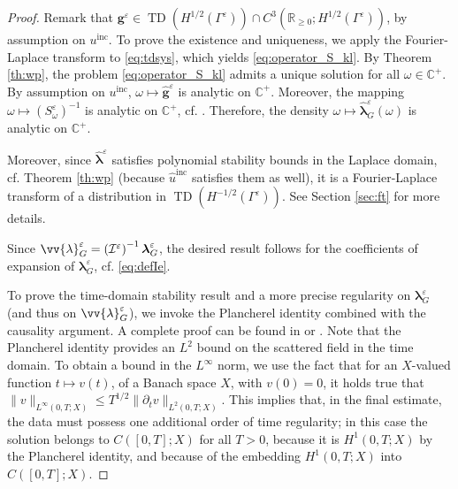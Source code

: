 \documentclass[]{article}
\numberwithin{equation}{section}
\numberwithin{theorem}{section}
\numberwithin{lemma}{section}
\numberwithin{corollary}{section}
\numberwithin{proposition}{section}
\numberwithin{definition}{section}
\newcommand{\blambda}{\boldsymbol{\lambda}}
\newcommand{\re}{\varepsilon}
\renewcommand{\vec}{\boldsymbol}
\newcommand{\adrian}[1]{{\color{magenta}{#1}}}
\newcommand{\inc}{\operatorname{inc}}
\begin{document}
	\begin{proof}
		Remark that $\vec{g}^{\re}\in \operatorname{TD}(H^{1/2}(\Gamma^{\re}))\cap C^3(\mathbb{R}_{\geq 0}; H^{1/2}(\Gamma^{\re}))$, by assumption on $u^{\operatorname{inc}}$. To prove the existence and uniqueness, we apply the Fourier-Laplace transform to \eqref{eq:tdsys}, which yields \eqref{eq:operator_S_kl}. 
		By Theorem \ref{th:wp}, the problem \eqref{eq:operator_S_kl} admits a unique solution for all $\omega \in \mathbb{C}^{+}$. By assumption on $u^{\operatorname{inc}}$, $\omega \mapsto \hat{\vec{g}}^{\re}$ is analytic on $\mathbb{C}^+$. Moreover, the mapping $\omega \mapsto (S^{\re}_{\omega})^{-1}$ is analytic on $\mathbb{C}^{+}$, cf. \cite[Lemma 13, p. 592]{dunford_schwartz}. Therefore, the density $\omega\mapsto \hat{\vec{\lambda}}^{\re}_G(\omega)$ is analytic on $\mathbb{C}^+$.
		
		
		
		Moreover, since $\hat{\blambda}^{\re}$ satisfies polynomial stability bounds in the Laplace domain, cf. Theorem \ref{th:wp} (because $\hat{u}^{\inc}$ satisfies them as well), it is a Fourier-Laplace transform of a distribution in $\operatorname{TD}(H^{-1/2}(\Gamma^{\re}))$. See Section \ref{sec:ft} for more details.
		
		Since $\vv{\lambda}^{\re}_G=\left(\mathcal{I}^{\re}\right)^{-1}\blambda_G^{\re}$, the desired result follows for the coefficients of expansion of $\blambda^{\re}_G$, cf. \eqref{eq:defIe}. 
		
		To prove the time-domain stability result and a more precise regularity on $\vec{\lambda}^{\re}_G$ (and thus on $\vv{\lambda}^{\re}_G$), we invoke the Plancherel identity combined with the causality argument.   A complete proof can be found in \cite[Section 4.5.2]{MK} or \cite[Proof of Proposition 3.2.2]{sayas}. 
		Note that the Plancherel identity provides an $L^2$ bound on the scattered field in the time domain. To obtain a bound in the $L^{\infty}$ norm, we use the fact that for an $X$-valued function $t \mapsto v(t)$, of a  Banach space $X$,  with $v(0)=0$, it holds true that $\| v \|_{L^{\infty}(0,T; X)} \leq T^{1/2} \| \partial_t v \|_{L^2(0,T; X)}$. This implies that, in the final estimate, the data must possess one additional order of time regularity; in this case the solution belongs to $C([0,T];X)$ for all $T>0$, because it is $H^1(0,T;X)$ by the Plancherel identity, and because of the embedding $H^1(0,T; X)$ into $C([0, T]; X)$.	
	\end{proof}
\end{document}
